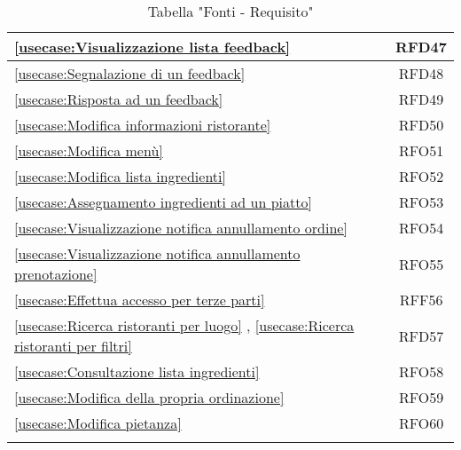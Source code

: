 \begin{longtable}{|l|c|}
	\hline
	\autoref{usecase:Visualizzazione lista feedback}                                                                                                             & RFD47                  \\
	\hline
	\autoref{usecase:Segnalazione di un feedback}                                                                                                                & RFD48                  \\
	\hline
	\autoref{usecase:Risposta ad un feedback}                                                                                                                    & RFD49                  \\
	\hline
	\autoref{usecase:Modifica informazioni ristorante}                                                                                                           & RFD50                  \\
	\hline
	\autoref{usecase:Modifica menù}                                                                                                                              & RFO51                  \\
	\hline
	\autoref{usecase:Modifica lista ingredienti}                                                                                                                 & RFO52                  \\
	\hline
	\autoref{usecase:Assegnamento ingredienti ad un piatto}                                                                                                      & RFO53                  \\
	\hline
	\autoref{usecase:Visualizzazione notifica annullamento ordine}                                                                                               & RFO54                  \\
	\hline
	\autoref{usecase:Visualizzazione notifica annullamento prenotazione}                                                                                         & RFO55				\\
	\hline
	\autoref{usecase:Effettua accesso per terze parti} 																											&RFF56                  \\
	\hline
	\autoref{usecase:Ricerca ristoranti per luogo} , \autoref{usecase:Ricerca ristoranti per filtri}															&RFD57                  \\
	\hline
	\autoref{usecase:Consultazione lista ingredienti} 																											&RFO58                  \\
	\hline
	\autoref{usecase:Modifica della propria ordinazione}																										&RFO59					\\
	\hline
	\autoref{usecase:Modifica pietanza}																															&RFO60                  \\
	\caption{Tabella "Fonti - Requisito"}
\end{longtable}



